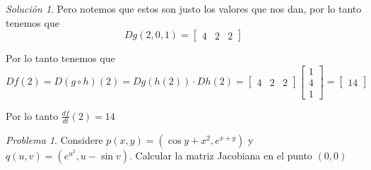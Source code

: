 \documentclass[a4paper,oneside,10.5pt]{article}
\theoremstyle{definition}
\theoremstyle{plain}
\theoremstyle{remark}
\theoremstyle{theorem}
\newtheorem{prob}{Problema}
\newtheorem{sol}{Solución}
\begin{document}
\begin{sol}
Pero notemos que estos son justo los valores que nos dan, por lo tanto tenemos que
\begin{equation*}
    Dg(2, 0, 1) = \begin{bmatrix}
        4 & 2 & 2
    \end{bmatrix}
\end{equation*}

Por lo tanto tenemos que
\begin{equation*}
    Df(2) = D(g \circ h)(2) = Dg(h(2)) \cdot Dh(2) = \begin{bmatrix}
        4 & 2 & 2
    \end{bmatrix} \begin{bmatrix}
        1\\ 4\\ 1
    \end{bmatrix} = \begin{bmatrix} 14 \end{bmatrix}
\end{equation*}

Por lo tanto $\frac{df}{dt}(2) = 14$
\end{sol}

\begin{prob}
Considere $p(x, y) = (\cos y + x^2, e^{x + y})$ y $q(u, v) = (e^{u^2}, u - \sin v)$. Calcular la matriz Jacobiana en el punto $(0, 0)$
\end{prob}
\end{document}
